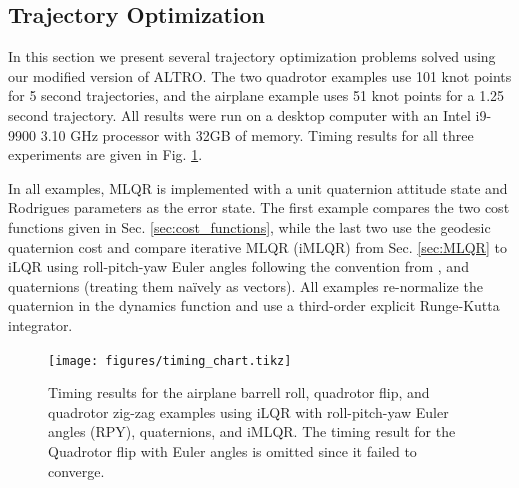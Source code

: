 \documentclass{svproc}
\begin{document}
    \subsection{Trajectory Optimization}
        In this section we present several trajectory optimization problems solved using our modified version of ALTRO. 
        The two quadrotor examples use 101 knot points for 5 second trajectories, and the airplane example uses 51 knot points for a 1.25 second trajectory. All results were run on a desktop computer with an Intel i9-9900 3.10 GHz processor with 32GB of memory. Timing results for all three experiments are given in Fig. \ref{fig:timing_chart}. 
        
        In all examples, MLQR is implemented with a unit quaternion attitude state and Rodrigues parameters as the error state. The first example compares the two cost functions given in Sec. \ref{sec:cost_functions}, while the last two use the geodesic quaternion cost and compare iterative MLQR (iMLQR) from Sec. \ref{sec:MLQR} to iLQR using roll-pitch-yaw Euler angles following the convention from \cite{michael2010grasp}, and quaternions (treating them na\"ively as vectors). All examples re-normalize the quaternion in the dynamics function and use a third-order explicit Runge-Kutta integrator.
        
        \begin{figure}
            \centering
            \texttt{[image: figures/timing\_chart.tikz]}
            \caption{Timing results for the airplane barrell roll, quadrotor flip, and quadrotor zig-zag examples using iLQR with roll-pitch-yaw Euler angles (RPY), quaternions, and iMLQR. The timing result for the Quadrotor flip with Euler angles is omitted since it failed to converge.}
            \label{fig:timing_chart}
        \end{figure}
        
        
\end{document}
